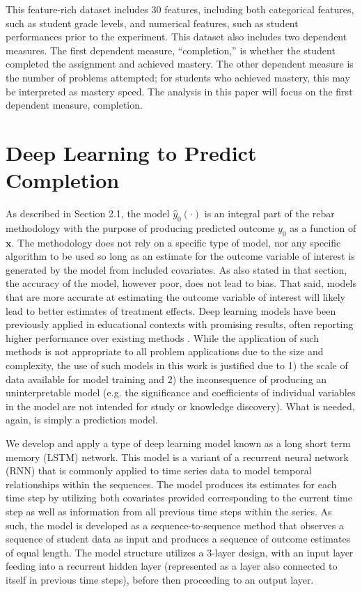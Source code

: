 \documentclass{edm_template}
\newcommand{\model}{\hat{y}_0(\cdot)}
\begin{document}
This feature-rich dataset includes 30 features, including both categorical features, such as student grade levels, and numerical features, such as student performances prior to the experiment. This dataset also includes two dependent measures. The first dependent measure, ``completion,'' is whether the student completed the assignment and achieved mastery. The other dependent measure is the number of problems attempted; for students who achieved mastery, this may be interpreted as mastery speed. The analysis in this paper will focus on the first dependent measure, completion. 



\section{Deep Learning to Predict Completion}\label{sec:deepLearning}
As described in Section 2.1, the model $\model$ is an integral part of the rebar methodology with the purpose of producing predicted outcome $y_0$ as a function of $\bm{x}$. The methodology does not rely on a specific type of model, nor any specific algorithm to be used so long as an estimate for the outcome variable of interest is generated by the model from included covariates. As also stated in that section, the accuracy of the model, however poor, does not lead to bias. That said, models that are more accurate at estimating the outcome variable of interest will likely lead to better estimates of treatment effects.
Deep learning models have been previously applied in educational contexts with promising results, often reporting higher performance over existing methods \cite{piech2015deep}\cite{khajah2016deep}\cite{botelho2017improving}. While the application of such methods is not appropriate to all problem applications due to the size and complexity, the use of such models in this work is justified due to 1) the scale of data available for model training and 2) the inconsequence of producing an uninterpretable model (e.g. the significance and coefficients of individual variables in the model are not intended for study or knowledge discovery). What is needed, again, is simply a prediction model.

We develop and apply a type of deep learning model known as a long short term memory (LSTM) \cite{hochreiter1997long} network. This model is a variant of a recurrent neural network (RNN) \cite{williams1989learning} that is commonly applied to time series data to model temporal relationships within the sequences. The model produces its estimates for each time step by utilizing both covariates provided corresponding to the current time step as well as information from all previous time steps within the series. As such, the model is developed as a sequence-to-sequence method that observes a sequence of student data as input and produces a sequence of outcome estimates of equal length. The model structure utilizes a 3-layer design, with an input layer feeding into a recurrent hidden layer (represented as a layer also connected to itself in previous time steps), before then proceeding to an output layer.
\end{document}
